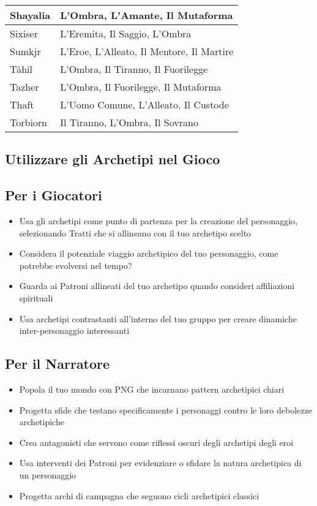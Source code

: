 \begin{multicols}{2}
\begin{tabularx}{\columnwidth}{lX}
\hline
Shayalia & L'Ombra, L'Amante, Il Mutaforma \\
\hline
Sixiser & L'Eremita, Il Saggio, L'Ombra \\
\hline
Sumkjr & L'Eroe, L'Alleato, Il Mentore, Il Martire \\
\hline
Tàhil & L'Ombra, Il Tiranno, Il Fuorilegge \\
\hline
Tazher & L'Ombra, Il Fuorilegge, Il Mutaforma \\
\hline
Thaft & L'Uomo Comune, L'Alleato, Il Custode \\
\hline
Torbiorn & Il Tiranno, L'Ombra, Il Sovrano \\
\bottomrule
\end{tabularx}

\subsection*{Utilizzare gli Archetipi nel Gioco}

\subsection*{Per i Giocatori}
\noindent\begin{itemize}[leftmargin=*] \setlength{\itemsep}{0pt}
\item Usa gli archetipi come punto di partenza per la creazione del personaggio, selezionando Tratti che si allineano con il tuo archetipo scelto
\item Considera il potenziale viaggio archetipico del tuo personaggio, come potrebbe evolversi nel tempo?
\item Guarda ai Patroni allineati del tuo archetipo quando consideri affiliazioni spirituali
\item Usa archetipi contrastanti all'interno del tuo gruppo per creare dinamiche inter-personaggio interessanti
\end{itemize}

\subsection*{Per il Narratore}
\noindent\begin{itemize}[leftmargin=*] \setlength{\itemsep}{0pt}
\item Popola il tuo mondo con PNG che incarnano pattern archetipici chiari
\item Progetta sfide che testano specificamente i personaggi contro le loro debolezze archetipiche
\item Crea antagonisti che servono come riflessi oscuri degli archetipi degli eroi
\item Usa interventi dei Patroni per evidenziare o sfidare la natura archetipica di un personaggio
\item Progetta archi di campagna che seguono cicli archetipici classici
\end{itemize}


\end{multicols}
